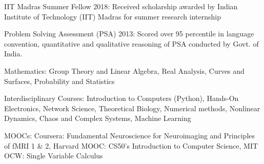 \documentclass[11pt,a4paper]{article} %
\begin{document}
\inlineheadsection
{IIT Madras Summer Fellow 2018:} 
{Received scholarship awarded by Indian Institute of
Technology (IIT) Madras for summer research internship}

\inlineheadsection
{Problem Solving Assessment (PSA) 2013:}
{Scored over 95 percentile in language convention, quantitative and qualitative reasoning of PSA conducted by Govt. of India.}


\spacedhrule{1.5em}{-0.4em}


\inlineheadsection 
{Mathematics:}
{Group Theory and Linear Algebra, Real Analysis, Curves and Surfaces, Probability and Statistics}

\inlineheadsection
{Interdisciplinary Courses:}
{Introduction to Computers (Python), Hands-On Electronics, Network Science, Theoretical Biology, Numerical methods, Nonlinear Dynamics, Chaos and Complex Systems, Machine Learning}

\inlineheadsection
{MOOCs:}
{Coursera: Fundamental Neuroscience for Neuroimaging and Principles of fMRI 1 \& 2, Harvard MOOC: CS50's Introduction to Computer Science, MIT OCW: Single Variable Calculus}

\spacedhrule{1.5em}{-0.4em}
\end{document}

